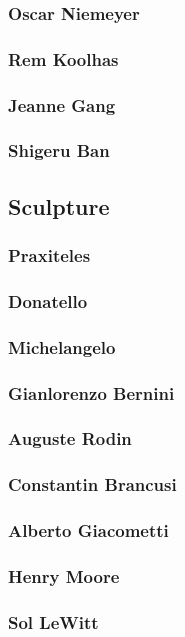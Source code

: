 			\subsubsection{Oscar Niemeyer}
			\subsubsection{Rem Koolhas}
			\subsubsection{Jeanne Gang}
			\subsubsection{Shigeru Ban}
		\newpage	
		\subsection{Sculpture}
			\subsubsection{Praxiteles}
			\subsubsection{Donatello}
			\subsubsection{Michelangelo}
			\subsubsection{Gianlorenzo Bernini}
			\subsubsection{Auguste Rodin}
			\subsubsection{Constantin Brancusi}
			\subsubsection{Alberto Giacometti}
			\subsubsection{Henry Moore}
			\subsubsection{Sol LeWitt}
